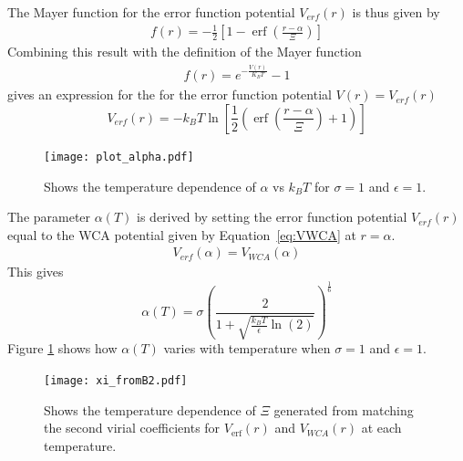 \documentclass[double,12pt]{beavtex}
\begin{document}
The Mayer function for the error function potential $V_{erf}(r)$ is thus 
given by
\begin{align}  \label{eq:VerfMayerfunction}
     f(r)=-\frac{1}{2}\left[1-\operatorname{erf}\left(\frac{r-\alpha}{\Xi}\right)\right]
\end{align} 
Combining this result with the definition of the Mayer function 
\begin{align}f(r)=e^{-\frac{V(r)}{K_BT}}-1\end{align} 
gives an expression for the for the error function potential  $V(r)=V_{erf}(r)$ 
\begin{equation} \label{eq:Verf}
	V_{erf}(r)=-k_BT\ln\left[\frac{1}{2}\left(\operatorname{erf}\left(\frac{r-\alpha}{\Xi}\right)+1\right)\right]
\end{equation}  

\begin{figure}
  \centering
  \texttt{[image: plot\_alpha.pdf]}
  \caption{Shows the temperature dependence of $\alpha$ vs $k_BT$ 
  for $\sigma=1$ and $\epsilon=1$.}
  \label{fig:alphaXivsT}
\end{figure}

The parameter $\alpha(T)$ is derived by setting 
the error function potential $V_{erf}(r)$ 
equal to the WCA potential given by Equation~\ref{eq:VWCA} at $r=\alpha$. 
\begin{align}
    V_{erf}(\alpha)=V_{WCA}(\alpha)
\end{align}
This gives
\begin{equation}\label{alphaT}\alpha(T)=\sigma\left(\frac{2}{1+\sqrt{\frac{k_BT}{\epsilon}\ln(2)}}\right)^\frac{1}{6}\end{equation} 
Figure \ref{fig:alphaXivsT} shows how $\alpha(T)$ varies with temperature 
when $\sigma=1$ and $\epsilon=1$.    

\begin{figure}
  \centering
  \texttt{[image: xi\_fromB2.pdf]}
  \caption{Shows the temperature dependence of $\Xi$ generated from 
  matching the second virial coefficients for $V_{\operatorname{erf}}(r)$ and $V_{WCA}(r)$ 
  at each temperature.}
  \label{fig:xi_fromB2vsT}
\end{figure}
\end{document}
